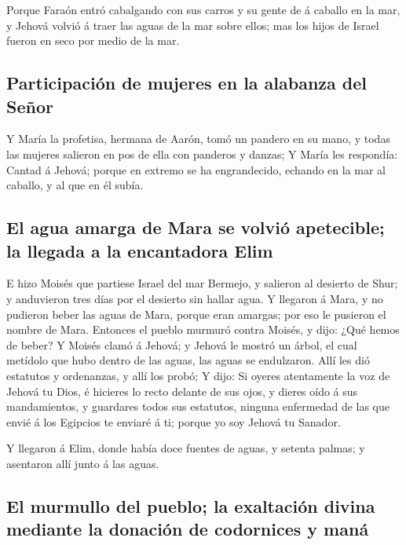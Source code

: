  Porque Faraón entró cabalgando con sus carros y su gente
de á caballo en la mar, y Jehová volvió á traer las aguas de la mar
sobre ellos; mas los hijos de Israel fueron en seco por medio de la mar.

\hypertarget{participaciuxf3n-de-mujeres-en-la-alabanza-del-seuxf1or}{%
\subsection{Participación de mujeres en la alabanza del
Señor}\label{participaciuxf3n-de-mujeres-en-la-alabanza-del-seuxf1or}}

 Y María la profetisa, hermana de Aarón, tomó un pandero en
su mano, y todas las mujeres salieron en pos de ella con panderos y
danzas;  Y María les respondía: Cantad á Jehová; porque en
extremo se ha engrandecido, echando en la mar al caballo, y al que en él
subía.

\hypertarget{el-agua-amarga-de-mara-se-volviuxf3-apetecible-la-llegada-a-la-encantadora-elim}{%
\subsection{El agua amarga de Mara se volvió apetecible; la llegada a la
encantadora
Elim}\label{el-agua-amarga-de-mara-se-volviuxf3-apetecible-la-llegada-a-la-encantadora-elim}}

 E hizo Moisés que partiese Israel del mar Bermejo, y
salieron al desierto de Shur; y anduvieron tres días por el desierto sin
hallar agua.  Y llegaron á Mara, y no pudieron beber las
aguas de Mara, porque eran amargas; por eso le pusieron el nombre de
Mara.  Entonces el pueblo murmuró contra Moisés, y dijo:
¿Qué hemos de beber?  Y Moisés clamó á Jehová; y Jehová le
mostró un árbol, el cual metídolo que hubo dentro de las aguas, las
aguas se endulzaron. Allí les dió estatutos y ordenanzas, y allí los
probó;  Y dijo: Si oyeres atentamente la voz de Jehová tu
Dios, é hicieres lo recto delante de sus ojos, y dieres oído á sus
mandamientos, y guardares todos sus estatutos, ninguna enfermedad de las
que envié á los Egipcios te enviaré á ti; porque yo soy Jehová tu
Sanador.

 Y llegaron á Elim, donde había doce fuentes de aguas, y
setenta palmas; y asentaron allí junto á las aguas.

\hypertarget{el-murmullo-del-pueblo-la-exaltaciuxf3n-divina-mediante-la-donaciuxf3n-de-codornices-y-manuxe1}{%
\subsection{El murmullo del pueblo; la exaltación divina mediante la
donación de codornices y
maná}\label{el-murmullo-del-pueblo-la-exaltaciuxf3n-divina-mediante-la-donaciuxf3n-de-codornices-y-manuxe1}}

